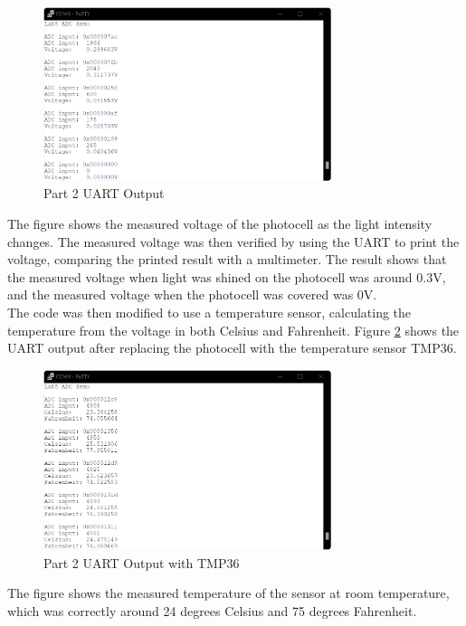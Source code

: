 \documentclass[CMPE]{KGCOEReport}
\begin{document}
\begin{figure}[H]
    \centering
    \includegraphics[width=0.75\textwidth]{part2a.png}
    \caption{Part 2 UART Output}
    \label{fig:part2a}
\end{figure}

The figure shows the measured voltage of the photocell as the light intensity changes. The measured voltage was then verified by using the UART to print the voltage, comparing the printed result with a multimeter. The result shows that the measured voltage when light was shined on the photocell was around 0.3V, and the measured voltage when the photocell was covered was 0V.\\

The code was then modified to use a temperature sensor, calculating the temperature from the voltage in both Celsius and Fahrenheit. Figure \ref{fig:part2b} shows the UART output after replacing the photocell with the temperature sensor TMP36.

\begin{figure}[H]
    \centering
    \includegraphics[width=0.75\textwidth]{part2b.png}
    \caption{Part 2 UART Output with TMP36}
    \label{fig:part2b}
\end{figure}

The figure shows the measured temperature of the sensor at room temperature, which was correctly around 24 degrees Celsius and 75 degrees Fahrenheit.\\
\end{document}
